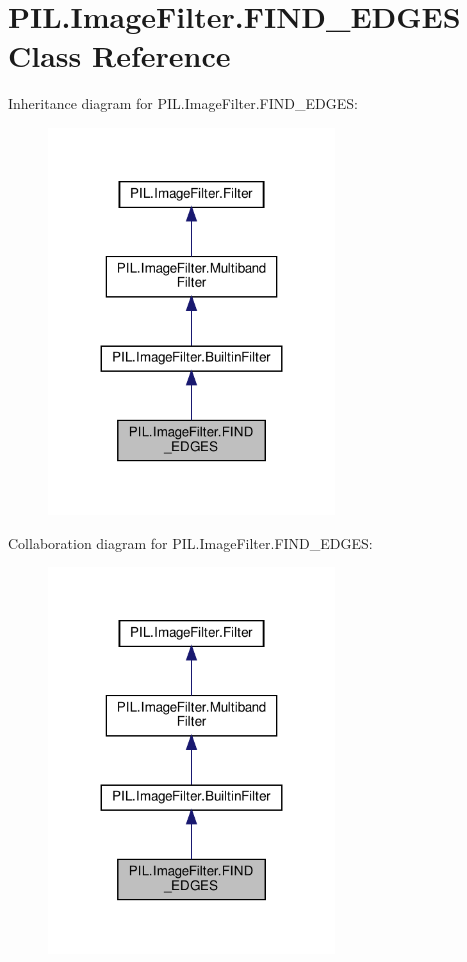 \hypertarget{classPIL_1_1ImageFilter_1_1FIND__EDGES}{}\section{P\+I\+L.\+Image\+Filter.\+F\+I\+N\+D\+\_\+\+E\+D\+G\+ES Class Reference}
\label{classPIL_1_1ImageFilter_1_1FIND__EDGES}


Inheritance diagram for P\+I\+L.\+Image\+Filter.\+F\+I\+N\+D\+\_\+\+E\+D\+G\+ES\+:
\nopagebreak
\begin{figure}[H]
\begin{center}
\leavevmode
\includegraphics[width=215pt]{classPIL_1_1ImageFilter_1_1FIND__EDGES__inherit__graph}
\end{center}
\end{figure}


Collaboration diagram for P\+I\+L.\+Image\+Filter.\+F\+I\+N\+D\+\_\+\+E\+D\+G\+ES\+:
\nopagebreak
\begin{figure}[H]
\begin{center}
\leavevmode
\includegraphics[width=215pt]{classPIL_1_1ImageFilter_1_1FIND__EDGES__coll__graph}
\end{center}
\end{figure}
